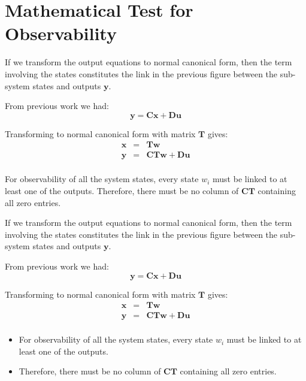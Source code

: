 
\section{Mathematical Test for Observability} %
\label{sec:mathematical_test_for_observability}

If we transform the output equations to normal canonical form, then the term involving the states constitutes the link in the previous figure between the sub-system states and outputs $\mathbf{y}$.

From previous work we had:
\[
\mathbf{y} = \mathbf{Cx} + \mathbf{Du}
\]
 
Transforming to normal canonical form with matrix $\mathbf{T}$ gives:
\begin{eqnarray*}
	\mathbf{x} & = & \mathbf{Tw} \\
	\mathbf{y}& = &\mathbf{CTw}+\mathbf{Du} \\
\end{eqnarray*}

For observability of all the system states, every state $w_i$ must be linked to at least one of the outputs.  Therefore, there must be no column of $\mathbf{CT}$  containing all zero entries.
\ifslidesonly
\begin{slide}
If we transform the output equations to normal canonical form, then the term involving the states constitutes the link in the previous figure between the sub-system states and outputs $\mathbf{y}$.

From previous work we had:
\[
\mathbf{y} = \mathbf{Cx} + \mathbf{Du}
\]

Transforming to normal canonical form with matrix $\mathbf{T}$ gives:
\begin{eqnarray*}
	\mathbf{x} & = & \mathbf{Tw} \\
	\mathbf{y}& = &\mathbf{CTw}+\mathbf{Du} \\
\end{eqnarray*}
\end{slide}
\begin{slide}
\begin{itemize}
	\item For observability of all the system states, every state $w_i$ must be linked to at least one of the outputs.
	\item Therefore, there must be no column of $\mathbf{CT}$  containing all zero entries.   
\end{itemize}
\end{slide}
\fi

